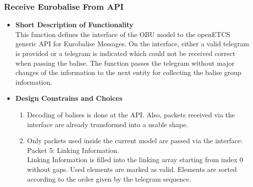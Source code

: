 
\subsubsection{Receive Eurobalise From API}
\begin{itemize}
\item \textbf{Short Description of Functionality}\\
This function defines the interface of the OBU model to the openETCS generic API for Eurobalise Messages. On the interface, either a valid telegram is provided or a telegram is indicated which could not be received correct when passing the balise. The function passes the telegram without major changes of the information to the next entity for collecting the balise group information.

\item \textbf{Design Constrains and Choices}\\
\begin{enumerate}
\item Decoding of balises is done at the API. Also, packets received via the interface are already transformed into a usable shape.
\item Only packets used inside the current model are passed via the interface:\\
	Packet 5: Linking Information.\\
	Linking Information is filled into the linking array starting from index 0 without gaps. Used elements are marked as valid. Elements are sorted according to the order given by the telegram sequence.

\end{enumerate}
\end{itemize}


